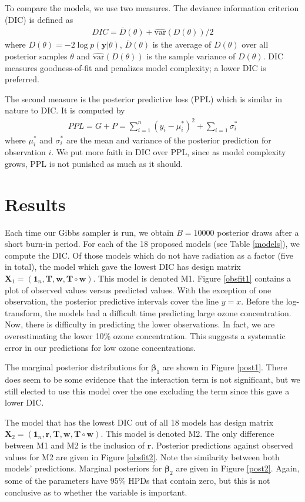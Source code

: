 \documentclass{asaproc}
\newcommand{\m}[1]{\mathbf{\bm{#1}}}
\begin{document}
To compare the models, we use two measures. The deviance information criterion (DIC) is defined as
\begin{eqnarray*}
DIC=\bar{D}(\theta)+\widehat{\mathrm{var}}(D(\theta))/2
\end{eqnarray*}
where $D(\theta)=-2\log p(\m{y}|\theta)$, $\bar{D}(\theta)$ is the average of $D(\theta)$ over all posterior samples $\theta$ and $\widehat{\mathrm{var}}(D(\theta))$ is the sample variance of $D(\theta)$. DIC measures goodness-of-fit and penalizes model complexity; a lower DIC is preferred.

The second measure is the posterior predictive loss (PPL) which is similar in nature to DIC. It is computed by
\begin{eqnarray*}
PPL=G+P=\sum_{i=1}^n(y_i-\mu_i^*)^2 + \sum_{i=1}\sigma_i^*
\end{eqnarray*}
where $\mu_i^*$ and $\sigma_i^*$ are the mean and variance of the posterior prediction for observation $i$. We put more faith in DIC over PPL, since as model complexity grows, PPL is not punished as much as it should.

\section{Results}

Each time our Gibbs sampler is run, we obtain $B=10000$ posterior draws after a short burn-in period. For each of the 18 proposed models (see Table \ref{models}), we compute the DIC. Of those models which do not have radiation as a factor (five in total), the model which gave the lowest DIC has design matrix $\m{X}_1=(\m{1}_n, \m{T},\m{w}, \m{T}\circ\m{w})$. This model is denoted M1. Figure \ref{obsfit1} contains a plot of observed values versus predicted values. With the exception of one observation, the posterior predictive intervals cover the line $y=x$. Before the log-transform, the models had a difficult time predicting large ozone concentration. Now, there is difficulty in predicting the lower observations. In fact, we are overestimating the lower 10\% ozone concentration. This suggests a systematic error in our predictions for low ozone concentrations.

The marginal posterior distributions for $\m{\beta}_1$ are shown in Figure \ref{post1}. There does seem to be some evidence that the interaction term is not significant, but we still elected to use this model over the one excluding the term since this gave a lower DIC.

The model that has the lowest DIC out of all 18 models has design matrix $\m{X}_2=(\m{1}_n,\m{r},\m{T},\m{w},\m{T}\circ\m{w})$. This model is denoted M2. The only difference between M1 and M2 is the inclusion of $\m{r}$. Posterior predictions against observed values for M2 are given in Figure \ref{obsfit2}. Note the similarity between both models' predictions. Marginal posteriors for $\m{\beta}_2$ are given in Figure \ref{post2}. Again, some of the parameters have 95\% HPDs that contain zero, but this is not conclusive as to whether the variable is important.
\end{document}
